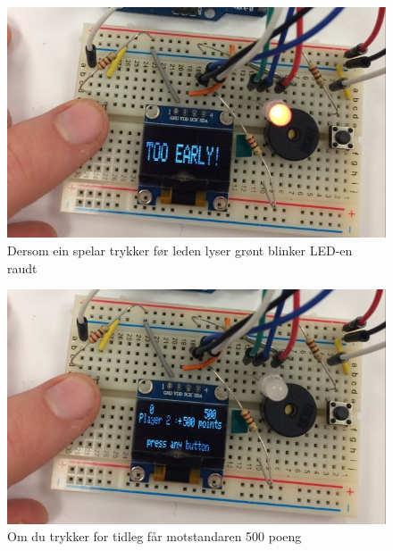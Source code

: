 \documentclass[journal]{IEEEtran}
\begin{document}
  \begin{figure}[!h]
    \begin{center}
      \includegraphics[scale=0.2]{03_fail}
      \caption{Dersom ein spelar trykker før leden lyser grønt blinker LED-en raudt}
    \end{center}
  \end{figure}
  \begin{figure}[!h]
    \begin{center}
      \includegraphics[scale=0.2]{03_penalty}
      \caption{Om du trykker for tidleg får motstandaren 500 poeng}
    \end{center}
  \end{figure}
\end{document}
